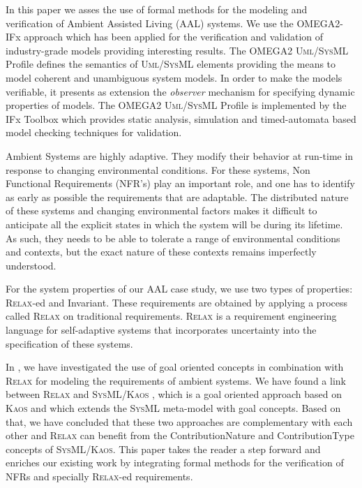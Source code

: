 \documentclass[a4paper,twoside]{article}
\def\myrelax{\textsc{Relax}}                  %
\def\sysml{\textsc{SysML}}
\def\UML{\textsc{Uml}}
\def\SysML{\textsc{SysML}}
\def\kaos{\textsc{Kaos}}
\begin{document}
In this paper we asses the use of formal methods for the modeling and verification of Ambient Assisted Living (AAL) systems. We use the OMEGA2-IFx approach which has been applied for the verification and validation of industry-grade models \cite{test2}  providing interesting results. The OMEGA2 \UML{}/\SysML{} Profile \cite{test3} defines the semantics of \UML{}/\SysML{} elements providing the means to model coherent and unambiguous system models. In order to make the models verifiable, it presents as extension the \textit{observer} mechanism for specifying dynamic properties of models. The OMEGA2 \UML{}/\SysML{} Profile is implemented by the IFx Toolbox \cite{test4} which provides static analysis, simulation and timed-automata based model checking \cite{test5} techniques for validation.

Ambient Systems are highly adaptive. They modify their behavior at run-time in response to changing environmental conditions. For these systems, Non Functional Requirements (NFR’s) play an important role, and one has to identify as early as possible the requirements that are adaptable. The distributed nature of 
these systems and changing environmental factors makes it difficult to anticipate all the explicit states in which the system will be during its lifetime. As such, they needs to be able to tolerate a range of environmental conditions and contexts, but the exact nature of these contexts remains imperfectly understood. 

For the system properties of our AAL case study, we use two types of properties: \myrelax{}-ed and Invariant. These requirements are obtained by applying a process called  \myrelax{} \cite{test6} on traditional requirements. \myrelax{}  is  a  requirement  engineering language for self-adaptive systems that incorporates uncertainty into the specification of these systems.

In \cite{test7}, we have investigated the use of goal oriented concepts in combination with \myrelax{} for modeling the requirements of ambient systems. We have found a link between \myrelax{} and \sysml{}/\kaos{} \cite{test8}, which is a goal oriented approach based on \kaos{} and which extends the \sysml{} meta-model with goal concepts. Based on that, 
we have concluded that these two approaches are complementary with each other and \myrelax{} can benefit from the ContributionNature and ContributionType concepts of \sysml{}/\kaos{}. This paper takes the reader a step forward and enriches our existing work by integrating formal methods for the verification of NFRs and specially  \myrelax{}-ed requirements.
\end{document}
